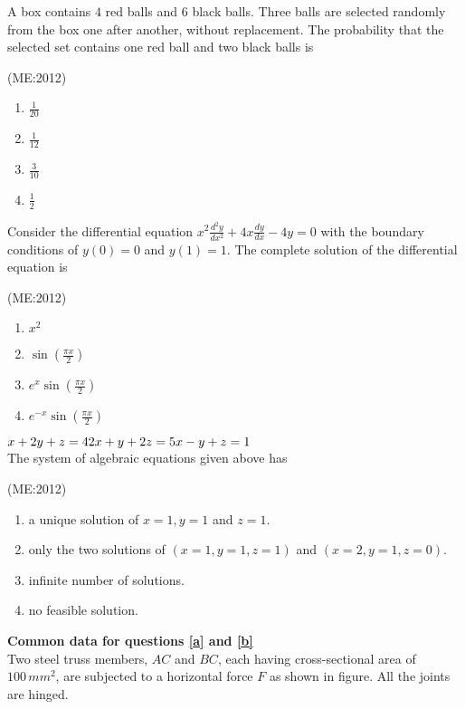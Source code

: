     \item A box contains $4$ red balls and $6$ black balls. Three balls are selected randomly from the box one after another, without replacement. The probability that the selected set contains one red ball and two black balls is

	     \hfill{(ME:2012)}
\begin{multicols}{4}
    \begin{enumerate}
        \item $\frac{1}{20}$
        \item $\frac{1}{12}$
        \item $\frac{3}{10}$
        \item $\frac{1}{2}$
    \end{enumerate}
\end{multicols}

    \item 
	    Consider the differential equation
   $ x^2 \frac{d^2y}{dx^2} + 4x \frac{dy}{dx} - 4y = 0$
    with the boundary conditions of $y(0) = 0$ and $y(1) = 1$. The complete solution of the differential equation is

     \hfill{(ME:2012)}
\begin{multicols}{4}
    \begin{enumerate}
        \item $x^2$
	\item $\sin (\frac{\pi x}{2})$
	\item $e^x \sin (\frac{\pi x}{2})$
	\item $e^{-x} \sin (\frac{\pi x}{2})$
    \end{enumerate}
\end{multicols}

    \item
$x + 2y + z = 4 \\
2x + y + 2z = 5 \\
x - y + z = 1$\\
    The system of algebraic equations given above has

     \hfill{(ME:2012)}
    \begin{enumerate}
        \item a unique solution of $x = 1, y = 1$ and $z = 1$.
        \item only the two solutions of $(x = 1, y = 1, z = 1)$ and $(x = 2, y = 1, z = 0)$.
        \item infinite number of solutions.
        \item no feasible solution.
    \end{enumerate}
\vspace{0.5cm}
     \textbf{Common data for questions \ref{a} and \ref{b}} \\ 
    Two steel truss members, $AC$ and $BC$, each having cross-sectional area of $100 \, {mm}^2$, are subjected to a horizontal force $F$ as shown in figure. All the joints are hinged.
    \begin{center}
	    
    \end{center}

